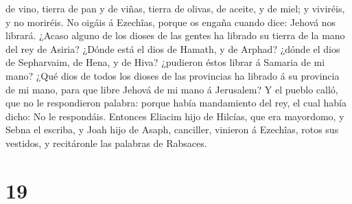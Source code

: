 de vino, tierra de pan y de viñas, tierra de olivas, de aceite, y de
miel; y viviréis, y no moriréis. No oigáis á Ezechîas, porque os engaña
cuando dice: Jehová nos librará.  ¿Acaso alguno de los
dioses de las gentes ha librado su tierra de la mano del rey de Asiria?
 ¿Dónde está el dios de Hamath, y de Arphad? ¿dónde el
dios de Sepharvaim, de Hena, y de Hiva? ¿pudieron éstos librar á Samaria
de mi mano?  ¿Qué dios de todos los dioses de las
provincias ha librado á su provincia de mi mano, para que libre Jehová
de mi mano á Jerusalem?  Y el pueblo calló, que no le
respondieron palabra: porque había mandamiento del rey, el cual había
dicho: No le respondáis.  Entonces Eliacim hijo de
Hilcías, que era mayordomo, y Sebna el escriba, y Joah hijo de Asaph,
canciller, vinieron á Ezechîas, rotos sus vestidos, y recitáronle las
palabras de Rabsaces.

\hypertarget{section-18}{%
\section{19}\label{section-18}}

